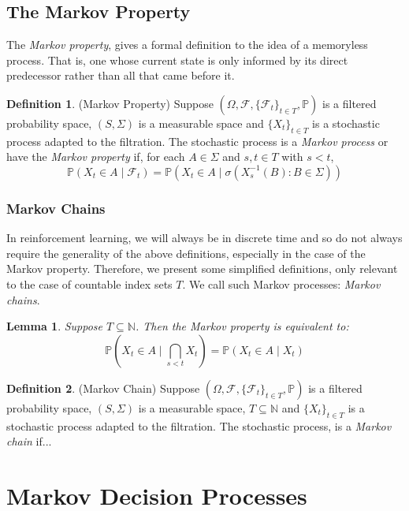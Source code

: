 \documentclass[a4paper,11pt,oneside]{book}
\theoremstyle{plain}
\newtheorem{lem}[thm]{Lemma}
\theoremstyle{definition}
\newtheorem{defn}{Definition}[section]
\begin{document}
\section{The Markov Property}
The \emph{Markov property}, gives a formal definition to the idea of a memoryless process. That is, one whose current state is only informed by its direct predecessor rather than all that came before it.
\begin{defn}{(Markov Property)}
Suppose $(\Omega,\mathcal{F},\{\mathcal{F}_t\}_{t \in T},\mathbb{P})$ is a filtered probability space, $(S, \Sigma)$ is a measurable space and $\{X_t\}_{t\in T}$ is a stochastic process adapted to the filtration. The stochastic process is a \emph{Markov process} or have the \emph{Markov property} if, for each $A \in \Sigma$ and $s,t \in T$ with $s<t$, \[\mathbb{P}(X_t \in A \mid \mathcal{F}_t) = \mathbb{P}(X_t \in A \mid \sigma({X_s^{-1}(B):B \in \Sigma}))\]
\end{defn}
\subsection{Markov Chains}
In reinforcement learning, we will always be in discrete time and so do not always require the generality of the above definitions, especially in the case of the Markov property. Therefore, we present some simplified definitions, only relevant to the case of countable index sets $T$. We call such Markov processes: \emph{Markov chains}.
\begin{lem}
Suppose $T \subseteq \mathbb{N}$. Then the Markov property is equivalent to:
\[\mathbb{P}\left(X_t \in A \mid \bigcap_{s<t} X_t\right) = \mathbb{P}(X_t \in A \mid X_t)\]
\end{lem}

\begin{defn}(Markov Chain)
Suppose $(\Omega,\mathcal{F},\{\mathcal{F}_t\}_{t \in T},\mathbb{P})$ is a filtered probability space, $(S, \Sigma)$ is a measurable space, $T \subseteq \mathbb{N}$ and $\{X_t\}_{t\in T}$ is a stochastic process adapted to the filtration. The stochastic process, is a \emph{Markov chain} if...
\end{defn}
\chapter{Markov Decision Processes}
\end{document}

